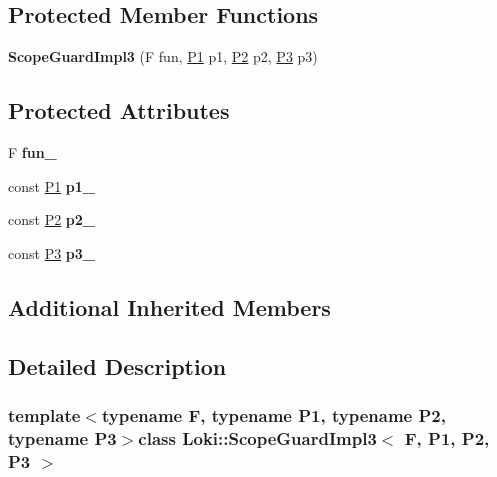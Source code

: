 \subsection*{Protected Member Functions}
\begin{DoxyCompactItemize}
\item 
\hypertarget{classLoki_1_1ScopeGuardImpl3_a87a18c4615dde3a1ac3dfe5a78c68392}{}{\bfseries Scope\+Guard\+Impl3} (F fun, \hyperlink{structP1}{P1} p1, \hyperlink{structP2}{P2} p2, \hyperlink{structP3}{P3} p3)\label{classLoki_1_1ScopeGuardImpl3_a87a18c4615dde3a1ac3dfe5a78c68392}

\end{DoxyCompactItemize}
\subsection*{Protected Attributes}
\begin{DoxyCompactItemize}
\item 
\hypertarget{classLoki_1_1ScopeGuardImpl3_a721a0e4536393fec533b737178e0e6ea}{}F {\bfseries fun\+\_\+}\label{classLoki_1_1ScopeGuardImpl3_a721a0e4536393fec533b737178e0e6ea}

\item 
\hypertarget{classLoki_1_1ScopeGuardImpl3_a29bbfaec0d8758894deff669d334b044}{}const \hyperlink{structP1}{P1} {\bfseries p1\+\_\+}\label{classLoki_1_1ScopeGuardImpl3_a29bbfaec0d8758894deff669d334b044}

\item 
\hypertarget{classLoki_1_1ScopeGuardImpl3_a077b8ed1b994ebe2877db8980cac87f1}{}const \hyperlink{structP2}{P2} {\bfseries p2\+\_\+}\label{classLoki_1_1ScopeGuardImpl3_a077b8ed1b994ebe2877db8980cac87f1}

\item 
\hypertarget{classLoki_1_1ScopeGuardImpl3_a32d01c045b22adfcdc0dcebd877d205b}{}const \hyperlink{structP3}{P3} {\bfseries p3\+\_\+}\label{classLoki_1_1ScopeGuardImpl3_a32d01c045b22adfcdc0dcebd877d205b}

\end{DoxyCompactItemize}
\subsection*{Additional Inherited Members}


\subsection{Detailed Description}
\subsubsection*{template$<$typename F, typename P1, typename P2, typename P3$>$class Loki\+::\+Scope\+Guard\+Impl3$<$ F, P1, P2, P3 $>$}

